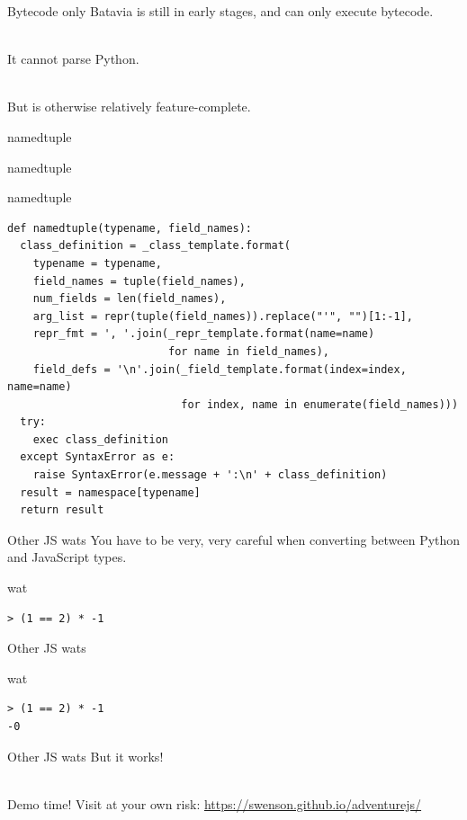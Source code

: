 \documentclass{beamer}
\def\py{
  \lstset{
     language=Python,
     extendedchars=true,
     basicstyle=\footnotesize\ttfamily,
     showstringspaces=false,
     showspaces=false,
     numbersep=9pt,
     tabsize=2,
     breaklines=true,
     showtabs=false,
     captionpos=b
  }
}
\def\js{
  \lstset{
     language=JavaScript,
     extendedchars=true,
     basicstyle=\ttfamily,
     showstringspaces=false,
     showspaces=false,
     numbersep=9pt,
     tabsize=2,
     breaklines=true,
     showtabs=false,
     captionpos=b
  }
}
\begin{document}
\begin{frame}[fragile]{Bytecode only}
Batavia is still in early stages, and can only execute bytecode.

\ \\

It cannot parse Python.

\ \\

But is otherwise relatively feature-complete.
\end{frame}
\begin{frame}{namedtuple}
\end{frame}

\begin{frame}[fragile]{namedtuple}

\begin{block}{namedtuple}
\py
\begin{lstlisting}
def namedtuple(typename, field_names):
  class_definition = _class_template.format(
    typename = typename,
    field_names = tuple(field_names),
    num_fields = len(field_names),
    arg_list = repr(tuple(field_names)).replace("'", "")[1:-1],
    repr_fmt = ', '.join(_repr_template.format(name=name)
                         for name in field_names),
    field_defs = '\n'.join(_field_template.format(index=index, name=name)
                           for index, name in enumerate(field_names)))
  try:
    exec class_definition
  except SyntaxError as e:
    raise SyntaxError(e.message + ':\n' + class_definition)
  result = namespace[typename]
  return result
\end{lstlisting}
\end{block}
\end{frame}

\begin{frame}[fragile]{Other JS wats}
You have to be very, very careful when converting between Python and JavaScript types.
\begin{block}{wat}
\js
\begin{lstlisting}
> (1 == 2) * -1
\end{lstlisting}
\end{block}
\end{frame}
\begin{frame}[fragile]{Other JS wats}
\begin{block}{wat}
\js
\begin{lstlisting}
> (1 == 2) * -1
-0
\end{lstlisting}
\end{block}
\end{frame}

\begin{frame}[fragile]{Other JS wats}
But it works!

\ \\

Demo time! Visit at your own risk: \url{https://swenson.github.io/adventurejs/}
\end{frame}
\end{document}
